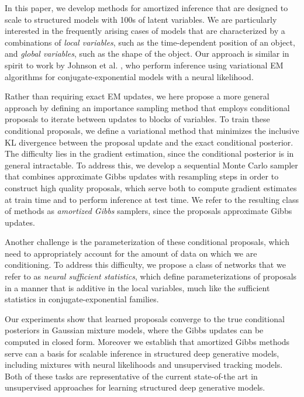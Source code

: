 \documentclass[anonymous=false, %
               format=acmsmall, %
               review=true, %
               screen=true, %
               nonacm=true]{acmart}
\theoremstyle{definition}
\begin{document}
In this paper, we develop methods for amortized inference that are designed to scale to structured models with 100s of latent variables. We are particularly interested in the frequently arising cases of models that are characterized by a combinations of \emph{local variables}, such as the time-dependent position of an object, and \emph{global variables}, such as the shape of the object. Our approach is similar in spirit to work by Johnson et al. \cite{johnson2016composing}, who perform inference using variational EM algorithms \cite{beal2003variational,bishop2006pattern,wainwright2008graphical} for conjugate-exponential models with a neural likelihood. 

Rather than requiring exact EM updates, we here propose a more general approach by defining an importance sampling method that employs conditional proposals to iterate between updates to blocks of variables. To train these conditional proposals, we define a variational method that minimizes the inclusive KL divergence between the proposal update and the exact conditional posterior. The difficulty lies in the gradient estimation, since the conditional posterior is in general intractable. To address this, we develop a sequential Monte Carlo sampler \cite{delmoral2006sequential} that combines approximate Gibbs updates with resampling steps in order to construct high quality proposals, which serve both to compute gradient estimates at train time and to perform inference at test time. We refer to the resulting class of methods as \emph{amortized Gibbs} samplers, since the proposals approximate Gibbs updates. 

Another challenge is the parameterization of these conditional proposals, which need to appropriately account for the amount of data on which we are conditioning. To address this difficulty, we propose a class of networks that we refer to as \emph{neural sufficient statistics}, which define parameterizations of proposals in a manner that is additive in the local variables, much like the sufficient statistics in conjugate-exponential families.

Our experiments show that learned proposals converge to the true conditional posteriors in Gaussian mixture models, where the Gibbs updates can be computed in closed form. Moreover we establish that amortized Gibbs methods serve can a basis for scalable inference in structured deep generative models, including mixtures with neural likelihoods and unsupervised tracking models. Both of these tasks are representative of the current state-of-the art in unsupervised approaches for learning structured deep generative models.
\end{document}
